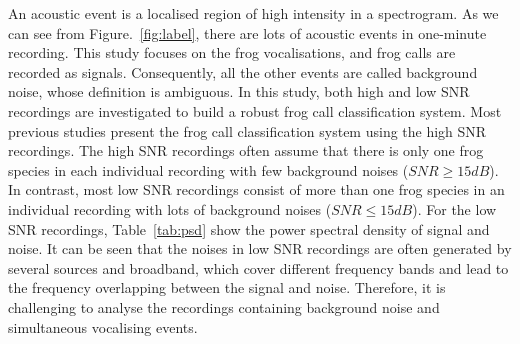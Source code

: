 An acoustic event is a localised region of high intensity in a spectrogram. As we can see from Figure.~\ref{fig:label}, there are lots of acoustic events in one-minute recording. This study focuses on the frog vocalisations, and frog calls are recorded as signals. Consequently, all the other events are called background noise, whose definition is ambiguous. In this study, both high and low SNR recordings are investigated to build a robust frog call classification system. Most previous studies present the frog call classification system using the high SNR recordings. The high SNR recordings often assume that there is only one frog species in each individual recording with few background noises ($SNR \geq 15 dB$). In contrast, most low SNR recordings consist of more than one frog species in an individual recording with lots of background noises ($SNR \leq 15 dB$). For the low SNR recordings, Table~\ref{tab:psd} show the power spectral density of signal and noise. It can be seen that the noises in low SNR recordings are often generated by several sources and broadband, which cover different frequency bands and lead to the frequency overlapping between the signal and noise. Therefore, it is challenging to analyse the recordings containing background noise and simultaneous vocalising events.




